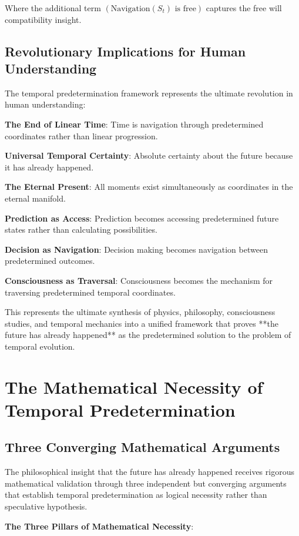 \documentclass[12pt,a4paper]{article}
\theoremstyle{definition}
\begin{document}
{Where the additional term $(\text{Navigation}(S_t) \text{ is free})$ captures the free will compatibility insight.

\subsection{Revolutionary Implications for Human Understanding}

The temporal predetermination framework represents the ultimate revolution in human understanding:

\textbf{The End of Linear Time}: Time is navigation through predetermined coordinates rather than linear progression.

\textbf{Universal Temporal Certainty}: Absolute certainty about the future because it has already happened.

\textbf{The Eternal Present}: All moments exist simultaneously as coordinates in the eternal manifold.

\textbf{Prediction as Access}: Prediction becomes accessing predetermined future states rather than calculating possibilities.

\textbf{Decision as Navigation}: Decision making becomes navigation between predetermined outcomes.

\textbf{Consciousness as Traversal}: Consciousness becomes the mechanism for traversing predetermined temporal coordinates.

This represents the ultimate synthesis of physics, philosophy, consciousness studies, and temporal mechanics into a unified framework that proves **the future has already happened** as the predetermined solution to the problem of temporal evolution.

\section{The Mathematical Necessity of Temporal Predetermination}

\subsection{Three Converging Mathematical Arguments}

The philosophical insight that the future has already happened receives rigorous mathematical validation through three independent but converging arguments that establish temporal predetermination as logical necessity rather than speculative hypothesis.

\textbf{The Three Pillars of Mathematical Necessity}:

}
\end{document}
